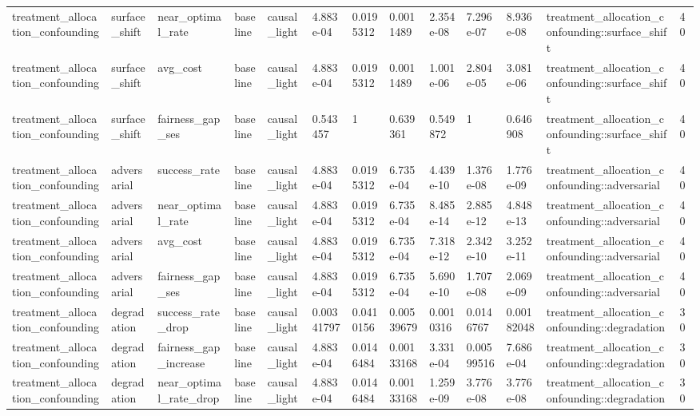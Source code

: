 \begin{tabular}{lllllllllllll}
treatment\_allocation\_confounding & surface\_shift & near\_optimal\_rate & baseline & causal\_light & 4.883e-04 & 0.0195312 & 0.0011489 & 2.354e-08 & 7.296e-07 & 8.936e-08 & treatment\_allocation\_confounding::surface\_shift & 40 \\
treatment\_allocation\_confounding & surface\_shift & avg\_cost & baseline & causal\_light & 4.883e-04 & 0.0195312 & 0.0011489 & 1.001e-06 & 2.804e-05 & 3.081e-06 & treatment\_allocation\_confounding::surface\_shift & 40 \\
treatment\_allocation\_confounding & surface\_shift & fairness\_gap\_ses & baseline & causal\_light & 0.543457 & 1 & 0.639361 & 0.549872 & 1 & 0.646908 & treatment\_allocation\_confounding::surface\_shift & 40 \\
treatment\_allocation\_confounding & adversarial & success\_rate & baseline & causal\_light & 4.883e-04 & 0.0195312 & 6.735e-04 & 4.439e-10 & 1.376e-08 & 1.776e-09 & treatment\_allocation\_confounding::adversarial & 40 \\
treatment\_allocation\_confounding & adversarial & near\_optimal\_rate & baseline & causal\_light & 4.883e-04 & 0.0195312 & 6.735e-04 & 8.485e-14 & 2.885e-12 & 4.848e-13 & treatment\_allocation\_confounding::adversarial & 40 \\
treatment\_allocation\_confounding & adversarial & avg\_cost & baseline & causal\_light & 4.883e-04 & 0.0195312 & 6.735e-04 & 7.318e-12 & 2.342e-10 & 3.252e-11 & treatment\_allocation\_confounding::adversarial & 40 \\
treatment\_allocation\_confounding & adversarial & fairness\_gap\_ses & baseline & causal\_light & 4.883e-04 & 0.0195312 & 6.735e-04 & 5.690e-10 & 1.707e-08 & 2.069e-09 & treatment\_allocation\_confounding::adversarial & 40 \\
treatment\_allocation\_confounding & degradation & success\_rate\_drop & baseline & causal\_light & 0.00341797 & 0.0410156 & 0.00539679 & 0.0010316 & 0.0146767 & 0.00182048 & treatment\_allocation\_confounding::degradation & 30 \\
treatment\_allocation\_confounding & degradation & fairness\_gap\_increase & baseline & causal\_light & 4.883e-04 & 0.0146484 & 0.00133168 & 3.331e-04 & 0.00599516 & 7.686e-04 & treatment\_allocation\_confounding::degradation & 30 \\
treatment\_allocation\_confounding & degradation & near\_optimal\_rate\_drop & baseline & causal\_light & 4.883e-04 & 0.0146484 & 0.00133168 & 1.259e-09 & 3.776e-08 & 3.776e-08 & treatment\_allocation\_confounding::degradation & 30 \\

\end{tabular}
